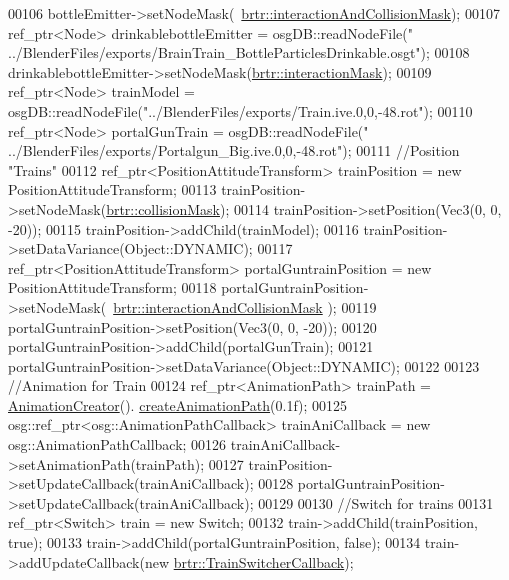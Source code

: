\begin{DoxyCode}
00106     bottleEmitter->setNodeMask(~\hyperlink{namespacebrtr_a21ab851f18c0c85fa006766034833a4f}{brtr::interactionAndCollisionMask});
00107     ref\_ptr<Node> drinkablebottleEmitter = osgDB::readNodeFile(\textcolor{stringliteral}{"
      ../BlenderFiles/exports/BrainTrain\_BottleParticlesDrinkable.osgt"});
00108     drinkablebottleEmitter->setNodeMask(\hyperlink{namespacebrtr_a2060f4d70c0e3bc7e2e35f82e279a40d}{brtr::interactionMask});
00109     ref\_ptr<Node> trainModel = osgDB::readNodeFile(\textcolor{stringliteral}{"../BlenderFiles/exports/Train.ive.0,0,-48.rot"});
00110     ref\_ptr<Node> portalGunTrain = osgDB::readNodeFile(\textcolor{stringliteral}{"
      ../BlenderFiles/exports/Portalgun\_Big.ive.0,0,-48.rot"});
00111     \textcolor{comment}{//Position "Trains" }
00112     ref\_ptr<PositionAttitudeTransform> trainPosition = \textcolor{keyword}{new} PositionAttitudeTransform;
00113     trainPosition->setNodeMask(\hyperlink{namespacebrtr_af79a815819e2ef65ea9cd43dc9d43679}{brtr::collisionMask});
00114     trainPosition->setPosition(Vec3(0, 0, -20));
00115     trainPosition->addChild(trainModel);
00116     trainPosition->setDataVariance(Object::DYNAMIC);
00117     ref\_ptr<PositionAttitudeTransform> portalGuntrainPosition = \textcolor{keyword}{new} PositionAttitudeTransform;
00118     portalGuntrainPosition->setNodeMask(~\hyperlink{namespacebrtr_a21ab851f18c0c85fa006766034833a4f}{brtr::interactionAndCollisionMask}
      );
00119     portalGuntrainPosition->setPosition(Vec3(0, 0, -20));
00120     portalGuntrainPosition->addChild(portalGunTrain);
00121     portalGuntrainPosition->setDataVariance(Object::DYNAMIC);
00122 
00123     \textcolor{comment}{//Animation for Train   }
00124     ref\_ptr<AnimationPath> trainPath = \hyperlink{class_animation_creator}{AnimationCreator}().
      \hyperlink{class_animation_creator_aca52f3472d0be7043c63ff5ede8084aa}{createAnimationPath}(0.1f);
00125     osg::ref\_ptr<osg::AnimationPathCallback> trainAniCallback = \textcolor{keyword}{new}  osg::AnimationPathCallback;
00126     trainAniCallback->setAnimationPath(trainPath);
00127     trainPosition->setUpdateCallback(trainAniCallback);
00128     portalGuntrainPosition->setUpdateCallback(trainAniCallback);
00129 
00130     \textcolor{comment}{//Switch for trains}
00131     ref\_ptr<Switch> train = \textcolor{keyword}{new} Switch;
00132     train->addChild(trainPosition, \textcolor{keyword}{true});
00133     train->addChild(portalGuntrainPosition, \textcolor{keyword}{false});
00134     train->addUpdateCallback(\textcolor{keyword}{new} \hyperlink{classbrtr_1_1_train_switcher_callback}{brtr::TrainSwitcherCallback});

\end{DoxyCode}

